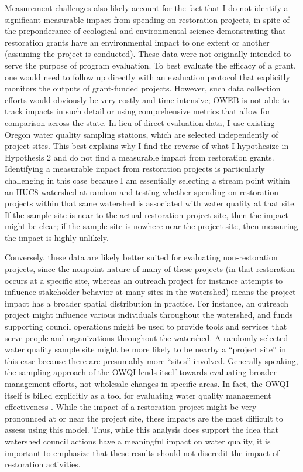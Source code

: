 \documentclass[12pt,a4paper,titlepage]{article}
\begin{document}
Measurement challenges also likely account for the fact that I do not identify a significant measurable impact from spending on restoration projects, in spite of the preponderance of ecological and environmental science demonstrating that restoration grants have an environmental impact to one extent or another (assuming the project is conducted). These data were not originally intended to serve the purpose of program evaluation. To best evaluate the efficacy of a grant, one would need to follow up directly with an evaluation protocol that explicitly monitors the outputs of grant-funded projects. However, such data collection efforts would obviously be very costly and time-intensive; OWEB is not able to track impacts in such detail or using comprehensive metrics that allow for comparison across the state. In lieu of direct evaluation data, I use existing Oregon water quality sampling stations, which are selected independently of project sites. This best explains why I find the reverse of what I hypothesize in Hypothesis 2 and do not find a measurable impact from restoration grants. Identifying a measurable impact from restoration projects is particularly challenging in this case because I am essentially selecting a stream point within an HUC8 watershed at random and testing whether spending on restoration projects within that same watershed is associated with water quality at that site. If the sample site is near to the actual restoration project site, then the impact might be clear; if the sample site is nowhere near the project site, then measuring the impact is highly unlikely.

Conversely, these data are likely better suited for evaluating non-restoration projects, since the nonpoint nature of many of these projects (in that restoration occurs at a specific site, whereas an outreach project for instance attempts to influence stakeholder behavior at many sites in the watershed) means the project impact has a broader spatial distribution in practice. For instance, an outreach project might influence various individuals throughout the watershed, and funds supporting council operations might be used to provide tools and services that serve people and organizations throughout the watershed. A randomly selected water quality sample site might be more likely to be nearby a “project site” in this case because there are presumably more ``sites'' involved. Generally speaking, the sampling approach of the OWQI lends itself towards evaluating broader management efforts, not wholesale changes in specific areas. In fact, the OWQI itself is billed explicitly as a tool for evaluating water quality management effectiveness \parencite{cude2001}. While the impact of a restoration project might be very pronounced at or near the project site, these impacts are the most difficult to assess using this model. Thus, while this analysis does support the idea that watershed council actions have a meaningful impact on water quality, it is important to emphasize that these results should not discredit the impact of restoration activities.
\end{document}
